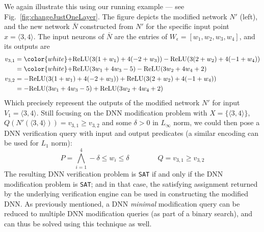 \documentclass{easychair}
\newcommand{\relu}{\text{ReLU}\xspace{}}
\newcommand{\sat}{\texttt{SAT}}
\begin{document}
We again illustrate this using our running example --- see
Fig.~\ref{fig:changeJustOneLayer}. The figure depicts the modified
network $N'$ (left), and the new network $\bar{N}$ constructed from
$N'$ for the specific input point $x=\langle 3,4\rangle$.
The input neurons of
$\bar{N}$ are the entries of
$W_\epsilon=[w_1,w_2,w_3,w_4]$, and its outputs are
\begin{align*}
  v_{3,1}&= {\color{white}+}\relu{}(3(1+w_1)+4(-2+w_3))
    -
    \relu{}(3(2+w_2)+4(-1+w_4))
  \\
        &= {\color{white}+}\relu{}(3w_1+4w_3-5)
    -
       \relu{}(3w_2 + 4w_4 +2)
       \\
  v_{3,2}&= -\relu{}(3(1+w_1)+4(-2+w_3))
    +
           \relu{}(3(2+w_2)+4(-1+w_4))
  \\
        &= -\relu{}(3w_1+4w_3-5)
    +
    \relu{}(3w_2+4w_4+2)
\end{align*}
Which precisely represent the outputs of the modified network $N'$ for input
$V_1=\langle 3,4 \rangle$. Still focusing on the DNN modification
problem with $X=\{\langle 3, 4\rangle\}$, $Q(N'(\langle
3,4\rangle))=v_{3,1}\geq v_{3,2}$ and some $\delta> 0$ in $L_\infty$
norm, we could then pose a DNN verification query with input and
output predicates (a similar encoding can be used for $L_1$ norm):
\begin{equation}
P = \bigwedge_{i=1}^4-\delta \leq w_i \leq \delta \qquad \qquad Q = v_{3,1}\geq v_{3,2}
\label{eq:infinityNormConstraint}
\end{equation}  
The resulting DNN verification problem is \sat{} if and only if the DNN
modification problem is \sat{}; and in that case, the satisfying
assignment returned by the underlying verification engine can be used
in constructing the modified DNN. As previously mentioned, a DNN
\emph{minimal} modification query can be reduced to multiple DNN
modification queries (as part of a binary search), and can thus be
solved using this technique as well.
\end{document}
